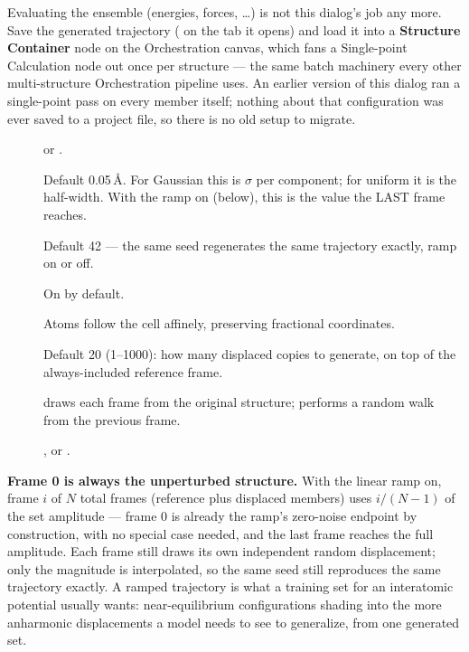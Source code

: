 \begin{calnote}
Evaluating the ensemble (energies, forces, \ldots) is not this dialog's job
any more. Save the generated trajectory (\menusep{} on the tab it opens) and load it into a
\textbf{Structure Container} node on the Orchestration canvas, which fans a
Single-point Calculation node out once per structure --- the same batch
machinery every other multi-structure Orchestration pipeline uses. An
earlier version of this dialog ran a single-point pass on every member
itself; nothing about that configuration was ever saved to a project file,
so there is no old setup to migrate.
\end{calnote}

\begin{description}
  \item[]  or .
  \item[] Default 0.05\,\AA. For Gaussian this is $\sigma$
    per component; for uniform it is the half-width. With the ramp on
    (below), this is the value the LAST frame reaches.
  \item[] Default 42 --- the same seed regenerates the same
    trajectory exactly, ramp on or off.
  \item[] On by default.
  \item[] Atoms follow the
    cell affinely, preserving fractional coordinates.
  \item[] Default 20 (1--1000): how many displaced copies to
    generate, on top of the always-included reference frame.
  \item[]  draws each frame from the
    original structure;  performs a random walk from the
    previous frame.
  \item[] , or .
\end{description}

\textbf{Frame 0 is always the unperturbed structure.} With the linear ramp
on, frame $i$ of $N$ total frames (reference plus displaced members) uses
$i/(N-1)$ of the set amplitude --- frame 0 is already the ramp's zero-noise
endpoint by construction, with no special case needed, and the last frame
reaches the full amplitude. Each frame still draws its own independent
random displacement; only the magnitude is interpolated, so the same seed
still reproduces the same trajectory exactly. A ramped trajectory is what a
training set for an interatomic potential usually wants: near-equilibrium
configurations shading into the more anharmonic displacements a model needs
to see to generalize, from one generated set.


